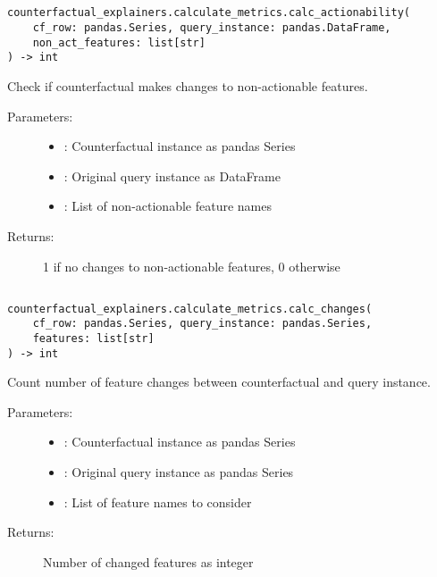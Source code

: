 \subsection{}
\label{func:calc_actionability}

\begin{lstlisting}
counterfactual_explainers.calculate_metrics.calc_actionability(
    cf_row: pandas.Series, query_instance: pandas.DataFrame,
    non_act_features: list[str]
) -> int
\end{lstlisting}

Check if counterfactual makes changes to non-actionable features.

\begin{description}
    \item[Parameters:]
        \begin{itemize}
            \item {}: Counterfactual instance as pandas Series
            \item {}: Original query instance as DataFrame
            \item {}: List of non-actionable feature names
        \end{itemize}
    \item[Returns:] 1 if no changes to non-actionable features, 0 otherwise
\end{description}

\subsection{}
\label{func:calc_changes}

\begin{lstlisting}
counterfactual_explainers.calculate_metrics.calc_changes(
    cf_row: pandas.Series, query_instance: pandas.Series,
    features: list[str]
) -> int
\end{lstlisting}

Count number of feature changes between counterfactual and query instance.

\begin{description}
    \item[Parameters:]
        \begin{itemize}
            \item {}: Counterfactual instance as pandas Series
            \item {}: Original query instance as pandas Series
            \item {}: List of feature names to consider
        \end{itemize}
    \item[Returns:] Number of changed features as integer
\end{description}


